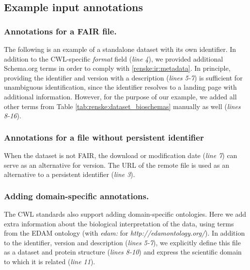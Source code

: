 \onecolumn
\subsection{Example input annotations}
\label{sec:renske:sup_example_annotations}

\subsubsection{Annotations for a FAIR file.}
\label{sec:renske:annot_fair}
The following is an example of a standalone dataset with its own identifier. In addition to the CWL-specific \emph{format} field (\emph{line 4}), we provided additional Schema.org terms in order to comply with \ref{renske:ir:metadata}. In principle, providing the identifier and version with a description (\emph{lines 5-7}) is sufficient for unambiguous identification, since the identifier resolves to a landing page with additional information. However, for the purpose of our example, we added all other terms from Table \ref{tab:renske:dataset_bioschemas} manually as well (\emph{lines 8-16}).



\subsubsection{Annotations for a file without persistent identifier} \label{sec:renske:annot_nonfair}

When the dataset is not FAIR, the download or modification date (\emph{line 7}) can serve as an alternative for version. The URL of the remote file is used as an alternative to a persistent identifier (\emph{line 3}).




\subsubsection{Adding domain-specific annotations.}

The CWL standards also support adding domain-specific ontologies. Here we add extra information about the biological interpretation of the data, using terms from the EDAM ontology (with \emph{edam:} for  \emph{http://edamontology.org/}). In addition to the identifier, version and description (\emph{lines 5-7}), we explicitly define this file as a dataset and protein structure (\emph{lines 8-10}) and express the scientific domain to which it is related (\emph{line 11}). 

